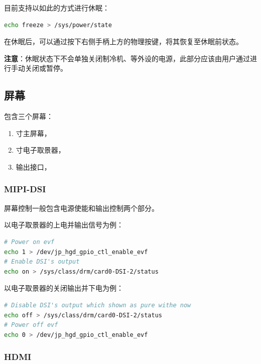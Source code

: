 \documentclass[UTF8]{ctexart}
\begin{document}
目前支持以如此的方式进行休眠：

\begin{lstlisting}[language=sh]
echo freeze > /sys/power/state
\end{lstlisting}

在休眠后，可以通过按下右侧手柄上方的物理按键，将其恢复至休眠前状态。

\textbf{注意}：休眠状态下不会单独关闭制冷机、等外设的电源，此部分应该由用户通过进行手动关闭或暂停。

\subsection{屏幕}

包含三个屏幕：

\begin{enumerate}
    \item {}寸主屏幕，
    \item {}寸电子取景器，
    \item {}输出接口，
\end{enumerate}

\subsubsection{MIPI-DSI}

屏幕控制一般包含电源使能和输出控制两个部分。

以电子取景器的上电并输出信号为例：

\begin{lstlisting}[language=sh]
# Power on evf
echo 1 > /dev/jp_hgd_gpio_ctl_enable_evf
# Enable DSI's output
echo on > /sys/class/drm/card0-DSI-2/status
\end{lstlisting}

以电子取景器的关闭输出并下电为例：

\begin{lstlisting}[language=sh]
# Disable DSI's output which shown as pure withe now
echo off > /sys/class/drm/card0-DSI-2/status
# Power off evf
echo 0 > /dev/jp_hgd_gpio_ctl_enable_evf
\end{lstlisting}

\subsubsection{HDMI}
\end{document}
